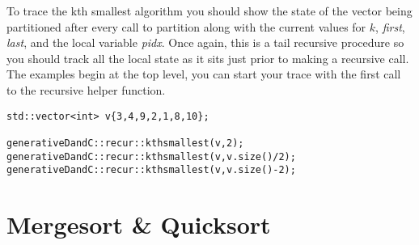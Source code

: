 \documentclass[10pt]{article}
\begin{document}
\begin{enumerate}
To trace the kth smallest algorithm you should show the state of the vector being partitioned after every call to partition along with the current values for $k$, \textit{first}, \textit{last}, and the local variable \textit{pidx}. Once again, this is a tail recursive procedure so you should track all the local state as it sits just prior to making a recursive call. The examples begin at the top level, you can start your trace with the first call to the recursive helper function.
\begin{lstlisting}
std::vector<int> v{3,4,9,2,1,8,10};

generativeDandC::recur::kthsmallest(v,2);
generativeDandC::recur::kthsmallest(v,v.size()/2);
generativeDandC::recur::kthsmallest(v,v.size()-2);
\end{lstlisting}
\end{enumerate}

\newpage \thispagestyle{empty}
\hspace{1in}
\newpage \thispagestyle{empty}

\section{Mergesort \& Quicksort}
\end{document}

